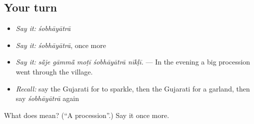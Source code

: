 \subsection*{Your turn}
\begin{itemize}
\raggedright
  \item \emph{Say it:} \emph{śobhāyātrā}
  \item \emph{Say it:} \emph{śobhāyātrā}, once more
  \item \emph{Say it:} \emph{sā̃je gāmmā̃ moṭī śobhāyātrā nīkḷī.} — In the evening a big procession went through the village.
  \item \emph{Recall:} say the Gujarati for to sparkle, then the Gujarati for a garland, then say \emph{śobhāyātrā} again
\end{itemize}

\begin{tcolorbox}[breakable,colback=teal!4,colframe=teal!35!black,title={Before you move on}]
What does  mean? (\textquotedblleft{}A procession\textquotedblright{}.) Say it once more.
\end{tcolorbox}
